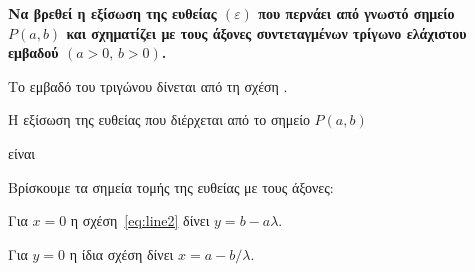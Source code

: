 \begin{exercise}
  {\bfseries \boldmath Να βρεθεί η εξίσωση της ευθείας $ (\varepsilon)
    $ που περνάει από γνωστό σημείο $ P(a,b) $ και σχηματίζει με τους άξονες
  συντεταγμένων τρίγωνο ελάχιστου εμβαδού $ (a>0,\, b>0) $.}
\end{exercise}
\begin{solution}
\item {}

  Το εμβαδό του τριγώνου δίνεται από τη σχέση 
  . 

  Η εξίσωση της ευθείας που διέρχεται από το σημείο $ P(a,b) $ 

  είναι 

  Βρίσκουμε τα σημεία τομής της ευθείας με τους άξονες:

  Για $ x = 0 $ η σχέση~\eqref{eq:line2} δίνει $ y = b - a\lambda $.

  Για $ y = 0 $ η ίδια σχέση δίνει $ x = a - {b}/{\lambda} $.


\end{solution}

